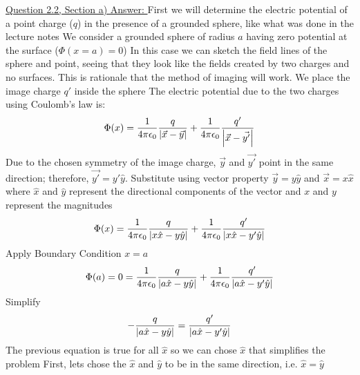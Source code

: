 \documentclass[12pt]{article}
\begin{document}
    \underline{Question 2.2, Section a) Answer: }
    \newline 
    \newline First we will determine the electric potential of a point charge ($q$) in the presence of a grounded sphere, like what was done in the lecture notes
    \newline We consider a grounded sphere of radius $a$ having zero potential at the surface ($\Phi(x=a)=0$)
    \newline In this case we can sketch the field lines of the sphere and point, seeing that they look like the fields created by two charges and no surfaces. This is rationale that the method of imaging will work. 
    \newline We place the image charge $q'$ inside the sphere
    \newline The electric potential due to the two charges using Coulomb's law is:
    \begin{equation} \label{eq: 1.1.1}
        \Phi(x) = \frac{1}{4 \pi \epsilon_0} \frac{q}{\abs{\vec{x}-\vec{y}}} + \frac{1}{4 \pi \epsilon_0} \frac{q'}{\abs{\vec{x} - \vec{y'}}}
    \end{equation}
    Due to the chosen symmetry of the image charge, $\vec{y}$ and $\vec{y'}$ point in the same direction; therefore, $\vec{y'} = y' \hat{y}$. 
    \newline Substitute using vector property $\vec{y} = y \hat{y}$ and $\vec{x} = x \hat{x}$ where $\hat{x}$ and $\hat{y}$ represent the directional components of the vector and $x$ and $y$ represent the magnitudes
    \begin{equation} \label{eq: 1.1.2}
        \Phi(x) = \frac{1}{4 \pi \epsilon_0} \frac{q}{\abs{x \hat{x}-y \hat{y}}} + \frac{1}{4 \pi \epsilon_0} \frac{q'}{\abs{x \hat{x} - y' \hat{y}}}
    \end{equation}
    Apply Boundary Condition $x=a$
    \begin{equation} \label{eq: 1.1.3}
        \Phi(a) = 0 = \frac{1}{4 \pi \epsilon_0} \frac{q}{\abs{a \hat{x}-y \hat{y}}} + \frac{1}{4 \pi \epsilon_0} \frac{q'}{\abs{a \hat{x} - y' \hat{y}}}
    \end{equation}
    Simplify
    \begin{equation} \label{eq: 1.1.4}
        -\frac{q}{\abs{a \hat{x}-y \hat{y}}} = \frac{q'}{\abs{a \hat{x} - y' \hat{y}}}
    \end{equation}
    The previous equation is true for all $\hat{x}$ so we can chose $\hat{x}$ that simplifies the problem 
    \newline First, lets chose the $\hat{x}$ and $\hat{y}$ to be in the same direction, i.e. $\hat{x} = \hat{y}$
\end{document}
